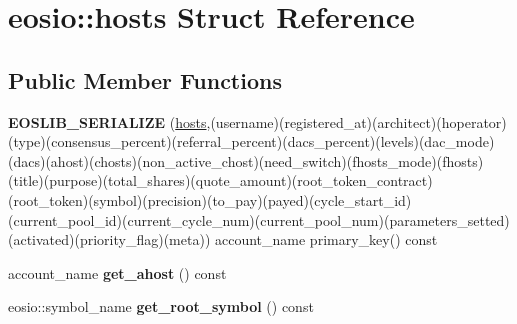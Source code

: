 \hypertarget{structeosio_1_1hosts}{}\section{eosio\+:\+:hosts Struct Reference}
\label{structeosio_1_1hosts}
\subsection*{Public Member Functions}
\begin{DoxyCompactItemize}
\item 
\mbox{\label{structeosio_1_1hosts_a53b86aa89c580a2759560963ed09b692}} 
{\bfseries E\+O\+S\+L\+I\+B\+\_\+\+S\+E\+R\+I\+A\+L\+I\+ZE} (\mbox{\hyperlink{structeosio_1_1hosts}{hosts}},(username)(registered\+\_\+at)(architect)(hoperator)(type)(consensus\+\_\+percent)(referral\+\_\+percent)(dacs\+\_\+percent)(levels)(dac\+\_\+mode)(dacs)(ahost)(chosts)(non\+\_\+active\+\_\+chost)(need\+\_\+switch)(fhosts\+\_\+mode)(fhosts)(title)(purpose)(total\+\_\+shares)(quote\+\_\+amount)(root\+\_\+token\+\_\+contract)(root\+\_\+token)(symbol)(precision)(to\+\_\+pay)(payed)(cycle\+\_\+start\+\_\+id)(current\+\_\+pool\+\_\+id)(current\+\_\+cycle\+\_\+num)(current\+\_\+pool\+\_\+num)(parameters\+\_\+setted)(activated)(priority\+\_\+flag)(meta)) account\+\_\+name primary\+\_\+key() const
\item 
\mbox{\label{structeosio_1_1hosts_a9f4f943d56c51d7c4e2306efd057b368}} 
account\+\_\+name {\bfseries get\+\_\+ahost} () const
\item 
\mbox{\label{structeosio_1_1hosts_a864795fe5217f5076420cd17f7295525}} 
eosio\+::symbol\+\_\+name {\bfseries get\+\_\+root\+\_\+symbol} () const
\end{DoxyCompactItemize}
